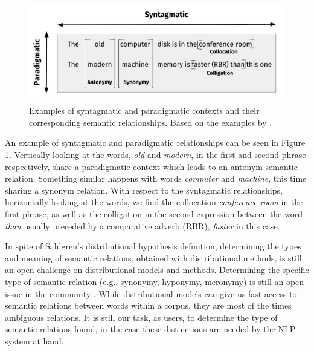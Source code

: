 \begin{figure}
\centering
\includegraphics[width=\linewidth]{images/Chapitre2/sintagmatic_paradigmatic.pdf}
\caption{Examples of syntagmatic and paradigmatic contexts and their corresponding semantic relationships. Based on the examples by \cite{sahlgren2008distributional,piero2017}.}
\label{fig:sintagmatic_paradigmatic}
\end{figure}


An example of syntagmatic and paradigmatic relationships can be seen in Figure \ref{fig:sintagmatic_paradigmatic}. Vertically looking at the words,  \textit{old} and \textit{modern}, in the first and second phrase respectively,  share a paradigmatic context which leads to an antonym semantic relation. Something similar happens with words \textit{computer} and \textit{machine}, this time sharing a synonym relation. With respect to the syntagmatic relationships, horizontally looking at the words, we find the collocation \textit{conference room} in the first phrase, as well as the colligation in the second expression between the word \textit{than} usually preceded by a  comparative adverb (RBR), \textit{faster} in this case. 

In spite of Sahlgren's  distributional hypothesis definition, determining the types and meaning of semantic relations, obtained with distributional methods, is still an open challenge on distributional models and methods. Determining the specific type of semantic relation (e.g., synonymy, hyponymy, meronymy) is still an open issue in the community \cite{turney2010,fabre2015,perinet2015}. While distributional models can give us fast access  to semantic relations between words within a corpus, they are most of the times ambiguous relations. It is still our task, as users, to determine the type of semantic relations found, in the case these distinctions are needed by the NLP system  at hand.


